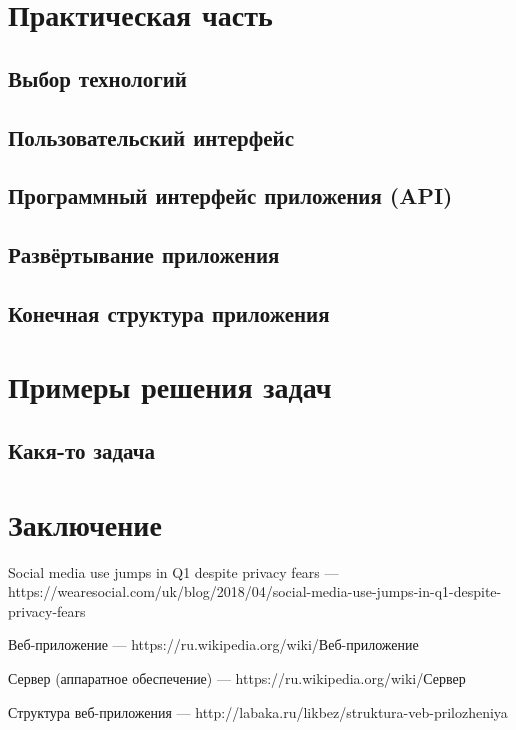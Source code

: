 \documentclass[14pt,a4paper]{scrartcl}
\begin{document}
    \newpage
    \section[Практическая часть]{Практическая часть}
    \subsection[Выбор технологий]{Выбор технологий}
    \subsection[Пользовательский интерфейс]{Пользовательский интерфейс}
    \subsection[Программный интерфейс приложения]{Программный интерфейс приложения (API)}
    \subsection[Развёртывание приложения]{Развёртывание приложения}
    \subsection[Конечная структура приложения]{Конечная структура приложения}

    \newpage
    \section[Примеры решения задач]{Примеры решения задач}
    \subsection[Какя-то задача]{Какя-то задача}

    \newpage
    \section[Заключение]{Заключение}

    \newpage
    \begin{thebibliography}{9}
        Social media use jumps in Q1 despite privacy fears
        \newblock --- https://wearesocial.com/uk/blog/2018/04/social-media-use-jumps-in-q1-despite-privacy-fears

        Веб-приложение
        \newblock --- https://ru.wikipedia.org/wiki/Веб-приложение

        Сервер (аппаратное обеспечение)
        \newblock --- https://ru.wikipedia.org/wiki/Сервер

        Структура веб-приложения
        \newblock --- http://labaka.ru/likbez/struktura-veb-prilozheniya



    \end{thebibliography}
\end{document}
